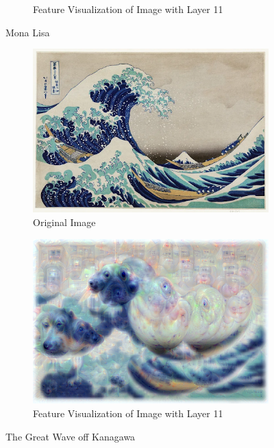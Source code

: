 \begin{figure}
\begin{subfigure}[t]{0.45\textwidth}
        \caption{Feature Visualization of Image with Layer 11}
    \end{subfigure}

    \caption{Mona Lisa}
    \label{fig:mona_dream}
\end{figure}

\begin{figure}
    \captionsetup{justification=centering}

    \begin{subfigure}[t]{0.45\textwidth}
        \captionsetup{justification=centering}
        \centering
        \includegraphics[width=.7\linewidth]{figuras/feat_vis/experiments/non_random/The-Great-Wave-off-Kanagawa.png}
        \caption{Original Image}
    \end{subfigure}
    \hfill
    \begin{subfigure}[t]{0.45\textwidth}
        \captionsetup{justification=centering}
        \centering
        \includegraphics[width=.7\linewidth]{figuras/feat_vis/experiments/non_random/The-Great-Wave-off-Kanagawa_li24_lr1e-2_pl4_no-blur.png}
        \caption{Feature Visualization of Image with Layer 11}
    \end{subfigure}

    \caption{The Great Wave off Kanagawa}
    \label{fig:wave_dream}
\end{figure}
